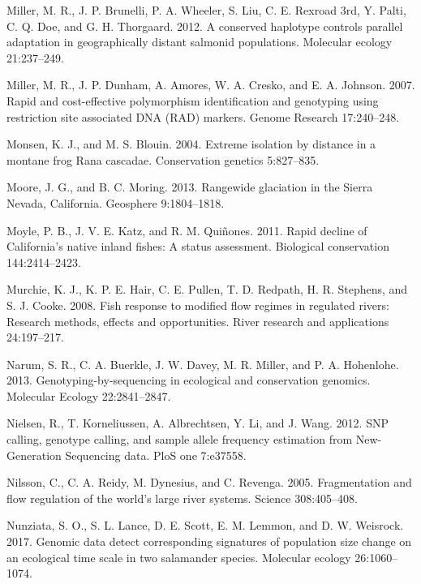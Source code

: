 \documentclass[proquest,12pt,final]{ucthesis-CA2012} %
\begin{document}
\begin{ucmainmatter}
\leavevmode\hypertarget{ref-miller_conserved_2012}{}%
Miller, M. R., J. P. Brunelli, P. A. Wheeler, S. Liu, C. E. Rexroad 3rd,
Y. Palti, C. Q. Doe, and G. H. Thorgaard. 2012. A conserved haplotype
controls parallel adaptation in geographically distant salmonid
populations. Molecular ecology 21:237--249.

\leavevmode\hypertarget{ref-miller_rapid_2007}{}%
Miller, M. R., J. P. Dunham, A. Amores, W. A. Cresko, and E. A. Johnson.
2007. Rapid and cost-effective polymorphism identification and
genotyping using restriction site associated DNA (RAD) markers. Genome
Research 17:240--248.

\leavevmode\hypertarget{ref-monsen_extreme_2004}{}%
Monsen, K. J., and M. S. Blouin. 2004. Extreme isolation by distance in
a montane frog Rana cascadae. Conservation genetics 5:827--835.

\leavevmode\hypertarget{ref-moore_rangewide_2013}{}%
Moore, J. G., and B. C. Moring. 2013. Rangewide glaciation in the Sierra
Nevada, California. Geosphere 9:1804--1818.

\leavevmode\hypertarget{ref-moyle_rapid_2011}{}%
Moyle, P. B., J. V. E. Katz, and R. M. Quiñones. 2011. Rapid decline of
California's native inland fishes: A status assessment. Biological
conservation 144:2414--2423.

\leavevmode\hypertarget{ref-murchie_fish_2008}{}%
Murchie, K. J., K. P. E. Hair, C. E. Pullen, T. D. Redpath, H. R.
Stephens, and S. J. Cooke. 2008. Fish response to modified flow regimes
in regulated rivers: Research methods, effects and opportunities. River
research and applications 24:197--217.

\leavevmode\hypertarget{ref-narum_genotyping-by-sequencing_2013}{}%
Narum, S. R., C. A. Buerkle, J. W. Davey, M. R. Miller, and P. A.
Hohenlohe. 2013. Genotyping-by-sequencing in ecological and conservation
genomics. Molecular Ecology 22:2841--2847.

\leavevmode\hypertarget{ref-nielsen_snp_2012}{}%
Nielsen, R., T. Korneliussen, A. Albrechtsen, Y. Li, and J. Wang. 2012.
SNP calling, genotype calling, and sample allele frequency estimation
from New-Generation Sequencing data. PloS one 7:e37558.

\leavevmode\hypertarget{ref-nilsson_fragmentation_2005}{}%
Nilsson, C., C. A. Reidy, M. Dynesius, and C. Revenga. 2005.
Fragmentation and flow regulation of the world's large river systems.
Science 308:405--408.

\leavevmode\hypertarget{ref-nunziata_genomic_2017}{}%
Nunziata, S. O., S. L. Lance, D. E. Scott, E. M. Lemmon, and D. W.
Weisrock. 2017. Genomic data detect corresponding signatures of
population size change on an ecological time scale in two salamander
species. Molecular ecology 26:1060--1074.


\end{ucmainmatter}
\end{document}
